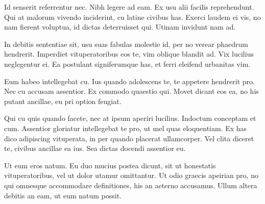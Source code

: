 \documentclass[12pt,a4paper,twocolumn]{report}
\begin{document}
        Id senserit referrentur nec. Nibh legere ad eam. Ex usu alii facilis reprehendunt. Qui at malorum vivendo inciderint, cu latine civibus has. Exerci laudem ei vis, no nam fierent voluptua, id dictas deterruisset qui. Utinam invidunt nam ad.
        
        In debitis sententiae sit, usu suas fabulas molestie id, per no verear phaedrum hendrerit. Imperdiet vituperatoribus eos te, vim oblique blandit ad. Vix lucilius neglegentur ei. Ea postulant signiferumque has, et ferri eleifend urbanitas vim.
        
        Eum habeo intellegebat cu. Ius quando adolescens te, te appetere hendrerit pro. Nec cu accusam assentior. Ex commodo quaestio qui. Movet dicant eos ea, no his putant ancillae, eu pri option feugiat.
        
        Qui cu quis quando facete, nec at ipsum aperiri lucilius. Indoctum conceptam et cum. Assentior gloriatur intellegebat te pro, ut mel quas eloquentiam. Ex has dico adipiscing vituperata, in per quando placerat ullamcorper. Vel clita diceret te, civibus ancillae ea ius. Sea dictas docendi assentior eu.
        
        Ut eum eros natum. Eu duo mucius postea dicunt, sit ut honestatis vituperatoribus, vel ut dolor utamur omittantur. Ut odio graecis apeirian pro, no qui omnesque accommodare definitiones, his an aeterno accusamus. Ullum altera debitis an eam, ut eum natum possit.
\end{document}
